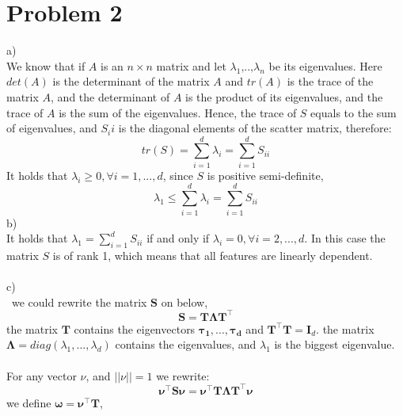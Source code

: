 \documentclass{article}
\begin{document}
\section{Problem 2}
a)\\
We know that if $A$ is an $n\times n$ matrix and let $\lambda_1 \text{,..,}\lambda_n$ be its eigenvalues. Here $det(A)$ is the determinant of the matrix $A$ and $tr(A)$ is the trace of the matrix $A$, and the determinant of $A$ is the product of its eigenvalues, and  the trace of $A$ is the sum of the eigenvalues. Hence, the trace of $S$ equals to the sum of eigenvalues, and $S_ii$ is the diagonal elements of the scatter matrix, therefore:
$$tr(S) = \sum\limits_{i =1}^{d} \lambda_i =  \sum\limits_{i =1}^{d} S_{ii} $$
It holds that $\lambda_i \geq 0, \forall i=1,...,d$, since $S$ is positive semi-definite,
$$\lambda_1 \leq \sum\limits_{i =1}^{d} \lambda_i  =  \sum\limits_{i =1}^{d} S_{ii} $$
b)\\
It holds that $\lambda_1 =  \sum\limits_{i =1}^{d} S_{ii} $ if and only if $\lambda_i =0, \forall i=2,...,d$.
In this case the matrix $S$ is of rank 1, which means that all features are linearly dependent.
\\
\\
c)\\\
we could rewrite the matrix $\mathbf{S}$ on below,
$$\mathbf{S} =  \mathbf{T} \mathbf{\Lambda}\mathbf{T}^\intercal$$
the matrix $\mathbf{T}$ contains the eigenvectors $\mathbf{\tau_1}, ..., \mathbf{\tau_d}$ and $ \mathbf{T}^\intercal \mathbf{T} = \mathbf{I}_d$. the matrix $\mathbf{\Lambda} = diag(\lambda_1,..., \lambda_d)$ contains the eigenvalues, and $\lambda_1$ is the biggest eigenvalue.\\
\\
For any vector $\nu$, and $||\nu||=1$ we rewrite:
$$\mathbf{\nu}^\intercal\mathbf{S}\mathbf{\nu} = \mathbf{\nu}^\intercal \mathbf{T} \mathbf{\Lambda}\mathbf{T}^\intercal \mathbf{\nu}$$
we define $\mathbf{\omega} =  \mathbf{\nu}^\intercal \mathbf{T}$,
\end{document}
